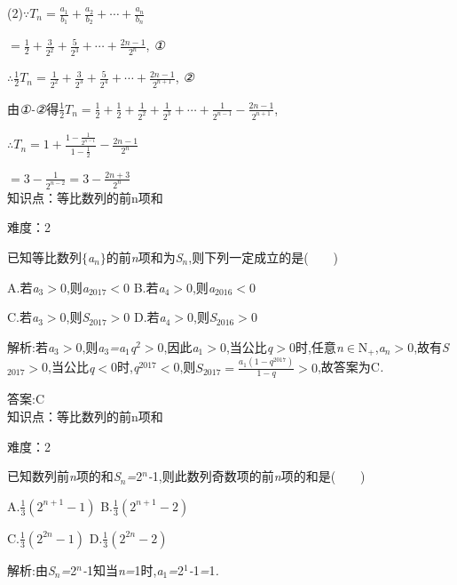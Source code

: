 \documentclass{article} %
\begin{document}
(2)$\because T_n=\frac{a_1}{b_1}+\frac{a_2}{b_2}+\cdots+\frac{a_n}{b_n}$

$=\frac{1}{2}+\frac{3}{2^2}+\frac{5}{2^3}+\cdots+\frac{2n-1}{2^n}$,\textit{ ①}

$\therefore \frac{1}{2}T_n=\frac{1}{2^2}+\frac{3}{2^3}+\frac{5}{2^4}+\cdots+\frac{2n-1}{2^{n+1}}$,\textit{ ②}

由\textit{①-②}得$\frac{1}{2}T_n=\frac{1}{2}+\frac{1}{2}+\frac{1}{2^2}+\frac{1}{2^3}+\cdots+\frac{1}{2^{n-1}}-\frac{2n-1}{2^{n+1}}$,

$\therefore T_n=1+\frac{1-\frac{1}{2^{n-1}}}{1-\frac{1}{2}}-\frac{2n-1}{2^n}$

$=3-\frac{1}{2^{n-2}}=3-\frac{2n+3}{2^n}$ \\

知识点：等比数列的前n项和

难度：2

 已知等比数列$\mathrm{\{}$\textit{a${}_{n}$}$\mathrm{\}}$的前\textit{n}项和为\textit{S${}_{n}$},则下列一定成立的是(\textit{　　})

 A.若\textit{a}${}_{3}$\textit{$>$}0,则\textit{a}${}_{2017}$\textit{$<$}0 B.若\textit{a}${}_{4}$\textit{$>$}0,则\textit{a}${}_{2016}$\textit{$<$}0

 C.若\textit{a}${}_{3}$\textit{$>$}0,则\textit{S}${}_{2017}$\textit{$>$}0 D.若\textit{a}${}_{4}$\textit{$>$}0,则\textit{S}${}_{2016}$\textit{$>$}0

 解析:若\textit{a}${}_{3}$\textit{$>$}0,则\textit{a}${}_{3}$\textit{=a}${}_{1}$\textit{q}${}^{2}$\textit{$>$}0,因此\textit{a}${}_{1}$\textit{$>$}0,当公比\textit{q$>$}0时,任意\textit{n}$\mathrm{\in}$N\textit{${}_{+}$},\textit{a${}_{n}$$>$}0,故有\textit{S}${}_{2017}$\textit{$>$}0,当公比\textit{q$<$}0时,\textit{q}${}^{2017}$\textit{$<$}0,则$S_{2017}=\frac{a_1(1-q^{2017})}{1-q}>0$,故答案为C\textit{.}

 答案:C \\

知识点：等比数列的前n项和

难度：2

 已知数列前\textit{n}项的和\textit{S${}_{n}$=}2\textit{${}^{n}$-}1,则此数列奇数项的前\textit{n}项的和是(\textit{　　})

 A.$\frac{1}{3}(2^{n+1}-1)$ B.$\frac{1}{3}(2^{n+1}-2)$

 C.$\frac{1}{3}(2^{2n}-1)$ D.$\frac{1}{3}(2^{2n}-2)$

 解析:由\textit{S${}_{n}$=}2\textit{${}^{n}$-}1知当\textit{n=}1时,\textit{a}${}_{1}$\textit{=}2${}^{1}$\textit{-}1\textit{=}1\textit{.}
\end{document}
